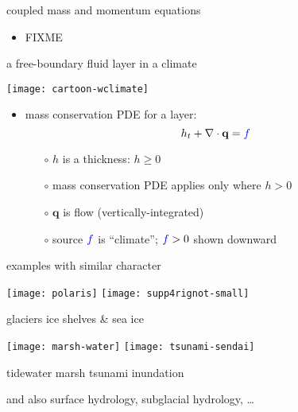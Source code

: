 \documentclass{beamer}
\newcommand\bq{\mathbf{q}}
\newcommand\Div{\nabla\cdot}
\begin{document}
\begin{frame}{coupled mass and momentum equations}

\begin{itemize}
\item FIXME
\end{itemize}
\end{frame}


\begin{frame}{a free-boundary fluid layer in a climate}

\begin{center}
\texttt{[image: cartoon-wclimate]}
\end{center}

\vspace{-7mm}
  \begin{itemize}
  \item mass conservation PDE for a layer:
      $$h_t + \Div\bq = {\color{blue} f}$$
    \begin{itemize}
    \vspace{-4mm}
    \item[$\circ$] $h$ is a thickness: $h\ge 0$
    \item[$\circ$] mass conservation PDE applies only where $h>0$
    \item[$\circ$] $\bq$ is flow (vertically-integrated)
    \item[$\circ$] source ${\color{blue} f}$ is ``climate''; ${\color{blue} f}>0$ shown downward
    \end{itemize}
  \end{itemize}
\end{frame}


\begin{frame}{examples with similar character}

\texttt{[image: polaris]}
\hfill
\texttt{[image: supp4rignot-small]}

\small glaciers \hfill ice shelves \& sea ice

\medskip
\texttt{[image: marsh-water]}
\hfill
\texttt{[image: tsunami-sendai]}

\small tidewater marsh \hfill tsunami inundation

\medskip
\scriptsize and also surface hydrology, subglacial hydrology, \dots
\end{frame}
\end{document}
